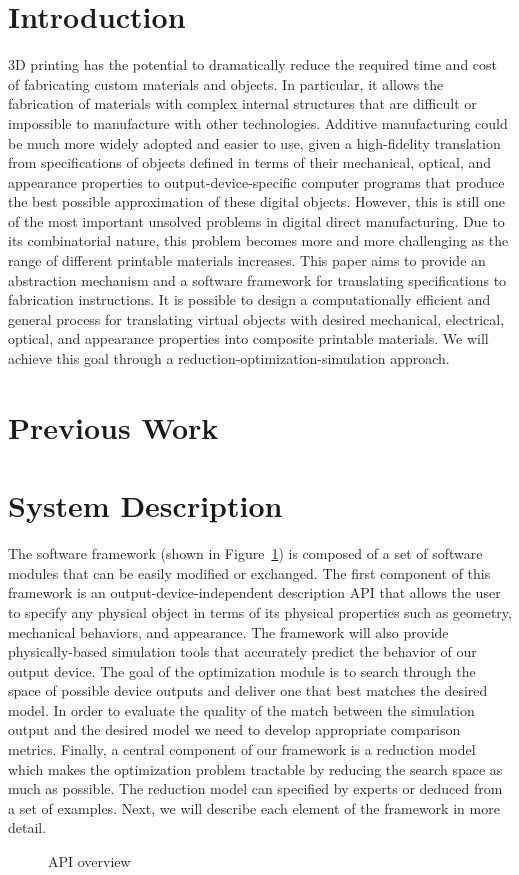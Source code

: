 \documentclass[annual]{acmsiggraph}
\begin{document}
\section{Introduction}
3D printing has the potential to dramatically reduce the required time and cost of
fabricating custom materials and objects. In particular, it allows the fabrication of materials with complex internal
structures that are difficult or impossible to manufacture with other technologies. Additive manufacturing could be
much more widely adopted and easier to use, given a high-fidelity translation from specifications of objects defined
in terms of their mechanical, optical, and appearance properties to output-device-specific computer
programs that produce the best possible approximation of these digital objects. However, this is still one of
the most important unsolved problems in digital direct manufacturing. Due to its combinatorial nature, this
problem becomes more and more challenging as the range of different printable materials increases. This paper
aims to provide an abstraction mechanism and a software framework for translating specifications to fabrication
instructions. It is possible to design a computationally efficient and general process for translating virtual objects
with desired mechanical, electrical, optical, and appearance properties into composite printable materials.
We will achieve this goal through a reduction-optimization-simulation approach.
\section{Previous Work}

\section{System Description}
The software framework (shown in Figure~\ref{fig:framework}) is composed of 
a set of software
modules that can be easily modified or exchanged. The first component
of this framework is an output-device-independent description API
that allows the user to specify any physical object in terms of its physical
properties such as geometry, mechanical behaviors, and appearance. 
The framework will also provide physically-based
simulation tools that accurately predict the behavior of our output device.
The goal of the optimization module is to search through
the space of possible device outputs and deliver one that best matches the
desired model. In order to evaluate the quality of the match between the
simulation output and the desired model we need to develop appropriate
comparison metrics. Finally, a central component of our framework is
a reduction model which makes the optimization problem tractable by
reducing the search space as much as possible.
The reduction model can specified by experts or deduced from a
set of examples. Next, we will describe each element of the framework in
more detail.
\begin{figure}
\caption{API overview}
\label{fig:framework}
\end{figure}
\end{document}

